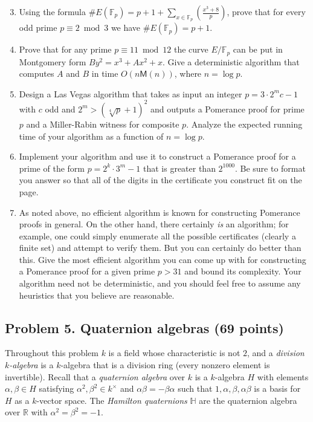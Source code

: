 \documentclass[11pt]{article}
\newcommand{\Fp}{\mathbb{F}_p}
\newcommand{\R}{\mathbb{R}}
\newcommand{\M}{\textsf{M}}
\theoremstyle{definition}
\begin{document}
\begin{enumerate}[{\bf (a)}]
\setcounter{enumi}{2}
\item
Using the formula $\#E(\Fp)=p+1+\sum_{x\in\Fp}\left(\frac{x^3+8}{p}\right)$, prove that for every odd prime $p\equiv 2\bmod 3$ we have $\#E(\Fp)=p+1$.
\item
Prove that for any prime $p\equiv 11\bmod 12$ the curve $E/\Fp$ can be put in Montgomery form $By^2=x^3+Ax^2+x$.
Give a deterministic algorithm that computes $A$ and $B$ in time $O(n\M(n))$, where $n=\log p$.
\item
Design a Las Vegas algorithm that takes as input an integer $p=3\cdot 2^mc-1$ with $c$ odd and $2^m > (\sqrt[4]{p}+1)^2$ and outputs a Pomerance proof for prime $p$ and a Miller-Rabin witness for composite $p$.  Analyze the expected running time of your algorithm as a function of $n=\log p$.
\item
Implement your algorithm and use it to construct a Pomerance proof for a prime of the form $p=2^k\cdot 3^m-1$ that is greater than $2^{1000}$.  Be sure to format you answer so that all of the digits in the certificate you construct fit on the page.

\item As noted above, no efficient algorithm is known for constructing Pomerance proofs in general.
On the other hand, there certainly \emph{is} an algorithm; for example, one could simply enumerate all the possible certificates (clearly a finite set) and attempt to verify them.
But you can certainly do better than this.
Give the most efficient algorithm you can come up with for constructing a Pomerance proof for a given prime $p>31$ and bound its complexity.
Your algorithm need not be deterministic, and you should feel free to assume any heuristics that you believe are reasonable.
\end{enumerate}

\subsection*{Problem 5. Quaternion algebras (69 points)}
Throughout this problem $k$ is a field whose characteristic is not $2$, and a \emph{division $k$-algebra} is a $k$-algebra that is a division ring (every nonzero element is invertible).
Recall that a \emph{quaternion algebra} over $k$ is a $k$-algebra $H$ with elements $\alpha,\beta\in H$ satisfying $\alpha^2,\beta^2\in k^\times$ and $\alpha\beta=-\beta\alpha$ such that $1,\alpha,\beta,\alpha\beta$ is a basis for $H$ as a $k$-vector space.
The \emph{Hamilton quaternions} $\mathbb H$ are the quaternion algebra over $\R$ with $\alpha^2=\beta^2=-1$.
\end{document}
